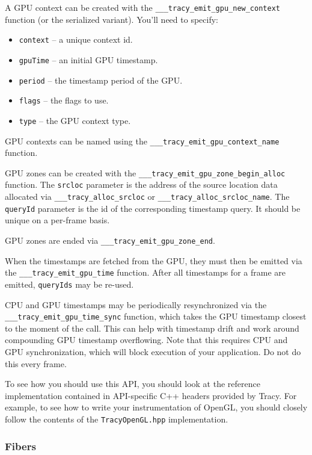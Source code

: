 \documentclass[hidelinks,titlepage,a4paper]{article}
\begin{document}
A GPU context can be created with the \texttt{\_\_\_tracy\_emit\_gpu\_new\_context} function (or the serialized variant). You'll need to specify:

\begin{itemize}
\item \texttt{context} -- a unique context id.
\item \texttt{gpuTime} -- an initial GPU timestamp.
\item \texttt{period} -- the timestamp period of the GPU.
\item \texttt{flags} -- the flags to use.
\item \texttt{type} -- the GPU context type.
\end{itemize}

GPU contexts can be named using the \texttt{\_\_\_tracy\_emit\_gpu\_context\_name} function.

GPU zones can be created with the \texttt{\_\_\_tracy\_emit\_gpu\_zone\_begin\_alloc} function. The \texttt{srcloc} parameter is the address of the source location data allocated via \texttt{\_\_\_tracy\_alloc\_srcloc} or \texttt{\_\_\_tracy\_alloc\_srcloc\_name}. The \texttt{queryId} parameter is the id of the corresponding timestamp query. It should be unique on a per-frame basis.

GPU zones are ended via \texttt{\_\_\_tracy\_emit\_gpu\_zone\_end}.

When the timestamps are fetched from the GPU, they must then be emitted via the \texttt{\_\_\_tracy\_emit\_gpu\_time} function. After all timestamps for a frame are emitted, \texttt{queryIds} may be re-used.

CPU and GPU timestamps may be periodically resynchronized via the \texttt{\_\_\_tracy\_emit\_gpu\_time\_sync} function, which takes the GPU timestamp closest to the moment of the call. This can help with timestamp drift and work around compounding GPU timestamp overflowing. Note that this requires CPU and GPU synchronization, which will block execution of your application. Do not do this every frame.

To see how you should use this API, you should look at the reference implementation contained in API-specific C++ headers provided by Tracy. For example, to see how to write your instrumentation of OpenGL, you should closely follow the contents of the \texttt{TracyOpenGL.hpp} implementation.

\subsubsection{Fibers}
\end{document}
